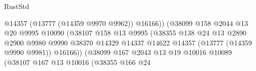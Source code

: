 \begin{lexlean}{RustStd}
\begin{coremodule}
                                                      @14357
                                                      (@13777 (@14359 @9970 @9962))
                                                      @16166))
                                                  (@38099
                                                    @158
                                                    @2044
                                                    @13
                                                    @20
                                                    @9995
                                                    @10090
                                                    (@38107
                                                      @158
                                                      @13
                                                      @9995
                                                      (@38355
                                                        @138
                                                        @24
                                                        @13
                                                        @2890
                                                        @2900
                                                        @9980
                                                        @9990
                                                        @38370
                                                        @14329
                                                        @14337
                                                        @14622
                                                        @14357
                                                        (@13777 (@14359 @9990 @9981))
                                                        @16166))
                                                    (@38099
                                                      @167
                                                      @2043
                                                      @13
                                                      @19
                                                      @10016
                                                      @10089
                                                      (@38107
                                                        @167
                                                        @13
                                                        @10016
                                                        (@38355
                                                          @166
                                                          @24

\end{coremodule}
\end{lexlean}
